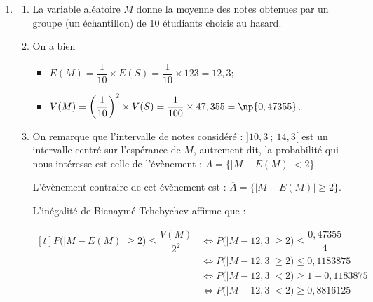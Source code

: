 \begin{enumerate}
	\begin{itemize}[label=\textbullet]
		\item pour espérance : \quad $E(N_i) = n \times p = 20 \times 0,615 = 12,3$;
		\item et pour variance : \quad $V(N_i) = n \times p \times (1-p) = 20 \times 0,615 \times 0,385 = 4,7355$.
	\end{itemize}

$S$ étant la somme de ces dix variables aléatoires, on a :

	\begin{itemize}
		\item $E(S) = E(N_1) + E(N_2) + \dots + E(N_{10}) = 12,3 + 12,3 + ... + 12,3 = 123$;
		\item comme les variables aléatoires sont indépendantes,

		$V(S) =  V(N_1) + V(N_2) + \dots + V(N_{10}) = 10 \times 4,7355 = 47,355$	.
\end{itemize}

	\item
	\begin{enumerate}
		\item  La variable aléatoire $M$ donne la moyenne des notes obtenues par un groupe (un échantillon) de 10 étudiants choisis au hasard.

		\item On a bien
		\begin{itemize}
			\item $E(M)= \dfrac{1}{10}\times E(S) = \dfrac{1}{10}\times 123 = 12,3$;
			\item $V(M)=\left(\dfrac{1}{10}\right)^2\times V(S) = \dfrac{1}{100}\times 47,355 =  \np{0,47355}$.
		\end{itemize}
		\item On remarque que l'intervalle de notes considéré : $]10,3 ~;~ 14,3[$ est un intervalle centré sur l'espérance de $M$, autrement dit, la probabilité qui nous intéresse est celle de l'évènement :
		\quad $A = \big\{|M - E(M)| < 2\big\} $.

		L'évènement contraire de cet évènement est : 		\quad $\overline{A} = \big\{|M - E(M)| \geqslant 2\big\} $.

		L'inégalité de Bienaymé-Tchebychev affirme que :

		$\begin{aligned}[t] P\big( |M - E(M)| \geqslant 2 \big) \leqslant \dfrac{V(M)}{2^2 } &\iff P\big( |M -12,3| \geqslant 2 \big) \leqslant \dfrac{0,47355}{4}\\
		&\iff P\big( |M -12,3| \geqslant 2 \big) \leqslant 0,1183875 \\
		&\iff P\big( |M -12,3| <  2 \big) \geqslant 1 - 0,1183875\\
		&\iff P\big( |M -12,3| <  2 \big) \geqslant 0,8816125  \end{aligned}$


\end{enumerate}
\end{enumerate}
